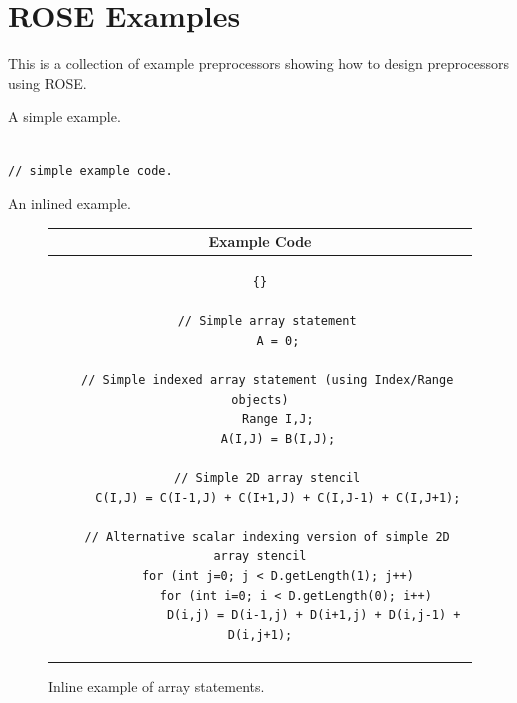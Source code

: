 \chapter{ROSE Examples}

\label{RoseExamples:RoseExamples}

    This is a collection of example preprocessors showing how to
design preprocessors using ROSE.


A simple example.

{\indent
{\mySmallFontSize
\begin{verbatim}

// simple example code.

\end{verbatim}
}
}


An inlined example.

\begin{figure}[tb]
\begin{center}
\begin{tabular}{|c|} \hline
 Example Code \\\hline\hline
\begin{lstlisting}{}

  // Simple array statement
     A = 0;

  // Simple indexed array statement (using Index/Range objects)
     Range I,J;
     A(I,J) = B(I,J);

  // Simple 2D array stencil
     C(I,J) = C(I-1,J) + C(I+1,J) + C(I,J-1) + C(I,J+1);

  // Alternative scalar indexing version of simple 2D array stencil
     for (int j=0; j < D.getLength(1); j++)
          for (int i=0; i < D.getLength(0); i++)
               D(i,j) = D(i-1,j) + D(i+1,j) + D(i,j-1) + D(i,j+1);

\end{lstlisting}
\\\hline
\end{tabular}
\end{center}
\caption{ Inline example of array statements. }
\label{AST_Code}
\end{figure}












